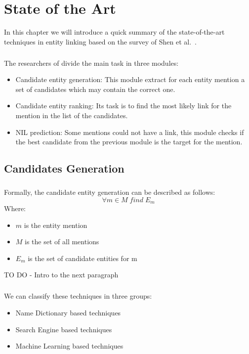 \chapter{State of the Art}
In this chapter we will introduce a quick summary of the state-of-the-art techniques in entity linking based on the survey of Shen et al.~\cite{shen2015entity}.
\paragraph{}
The researchers of \cite{shen2015entity} divide the main task in three modules:
\begin{itemize}
\item Candidate entity generation: This module extract for each entity mention a set of candidates which may contain the correct one.
\item Candidate entity ranking: Its task is to find the most likely link for the mention in the list of the candidates.
\item NIL prediction: Some mentions could not have a link, this module checks if the best candidate from the previous module is the target for the mention. 
\end{itemize}

\section{Candidates Generation}
\paragraph{}
Formally, the candidate entity generation can be described as follows:
\[\forall m \in M \; find \; E_m\]
Where:

\begin{itemize}[noitemsep,  topsep=10pt]
\item $m$ is the entity mention
\item $M$ is the set of all mentions
\item $E_m$ is the set of candidate entities for m
\end{itemize}

TO DO - Intro to the next paragraph

\paragraph{}
We can classify these techniques in three groups:
\begin{itemize}[noitemsep,  topsep=10pt]
\item Name Dictionary based techniques
\item Search Engine based techniques
\item Machine Learning based techniques
\end{itemize}


